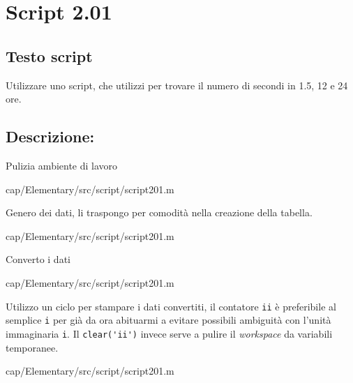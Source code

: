 \section{Script 2.01}\label{scr:script201}

\subsection{Testo script}
Utilizzare uno script, che utilizzi  per trovare il 
numero di secondi in 1.5, 12 e 24 ore.

\subsection{Descrizione:}
Pulizia ambiente di lavoro

{cap/Elementary/src/script/script201.m}
\vspace{0.5em}

Genero dei dati, li traspongo per comodità nella creazione della tabella.

{cap/Elementary/src/script/script201.m}
\vspace{1em}

Converto i dati

{cap/Elementary/src/script/script201.m}
\vspace{1em}

Utilizzo un ciclo per stampare i dati convertiti, il contatore \verb|ii| è 
preferibile al semplice \verb|i| per già da ora abituarmi a evitare possibili 
ambiguità con l'unità immaginaria \verb|i|. Il \verb|clear('ii')| invece serve 
a pulire il \textit{workspace} da variabili temporanee.

{cap/Elementary/src/script/script201.m}
\vspace{1em}

%

\pagebreak
